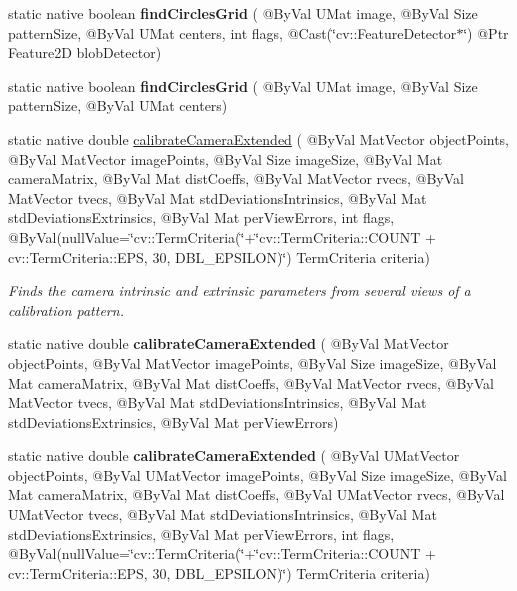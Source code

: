 \begin{DoxyCompactItemize}
\item 
static native boolean {\bfseries find\+Circles\+Grid} ( @By\+Val U\+Mat image, @By\+Val Size pattern\+Size, @By\+Val U\+Mat centers, int flags, @Cast(\char`\"{}cv\+::\+Feature\+Detector$\ast$\char`\"{}) @Ptr Feature2D blob\+Detector)
\item 
static native boolean {\bfseries find\+Circles\+Grid} ( @By\+Val U\+Mat image, @By\+Val Size pattern\+Size, @By\+Val U\+Mat centers)
\item 
static native double \hyperlink{group__calib3d_ga9829f846450d1022f08716b7c20412d6}{calibrate\+Camera\+Extended} ( @By\+Val Mat\+Vector object\+Points, @By\+Val Mat\+Vector image\+Points, @By\+Val Size image\+Size, @By\+Val Mat camera\+Matrix, @By\+Val Mat dist\+Coeffs, @By\+Val Mat\+Vector rvecs, @By\+Val Mat\+Vector tvecs, @By\+Val Mat std\+Deviations\+Intrinsics, @By\+Val Mat std\+Deviations\+Extrinsics, @By\+Val Mat per\+View\+Errors, int flags, @By\+Val(null\+Value=\char`\"{}cv\+::\+Term\+Criteria(\char`\"{}+\char`\"{}cv\+::\+Term\+Criteria\+::\+C\+O\+U\+NT + cv\+::\+Term\+Criteria\+::\+E\+PS, 30, D\+B\+L\+\_\+\+E\+P\+S\+I\+L\+ON)\char`\"{}) Term\+Criteria criteria)
\begin{DoxyCompactList}\small\item\em Finds the camera intrinsic and extrinsic parameters from several views of a calibration pattern. \end{DoxyCompactList}\item 
static native double {\bfseries calibrate\+Camera\+Extended} ( @By\+Val Mat\+Vector object\+Points, @By\+Val Mat\+Vector image\+Points, @By\+Val Size image\+Size, @By\+Val Mat camera\+Matrix, @By\+Val Mat dist\+Coeffs, @By\+Val Mat\+Vector rvecs, @By\+Val Mat\+Vector tvecs, @By\+Val Mat std\+Deviations\+Intrinsics, @By\+Val Mat std\+Deviations\+Extrinsics, @By\+Val Mat per\+View\+Errors)
\item 
static native double {\bfseries calibrate\+Camera\+Extended} ( @By\+Val U\+Mat\+Vector object\+Points, @By\+Val U\+Mat\+Vector image\+Points, @By\+Val Size image\+Size, @By\+Val Mat camera\+Matrix, @By\+Val Mat dist\+Coeffs, @By\+Val U\+Mat\+Vector rvecs, @By\+Val U\+Mat\+Vector tvecs, @By\+Val Mat std\+Deviations\+Intrinsics, @By\+Val Mat std\+Deviations\+Extrinsics, @By\+Val Mat per\+View\+Errors, int flags, @By\+Val(null\+Value=\char`\"{}cv\+::\+Term\+Criteria(\char`\"{}+\char`\"{}cv\+::\+Term\+Criteria\+::\+C\+O\+U\+NT + cv\+::\+Term\+Criteria\+::\+E\+PS, 30, D\+B\+L\+\_\+\+E\+P\+S\+I\+L\+ON)\char`\"{}) Term\+Criteria criteria)
\item 

\end{DoxyCompactItemize}
